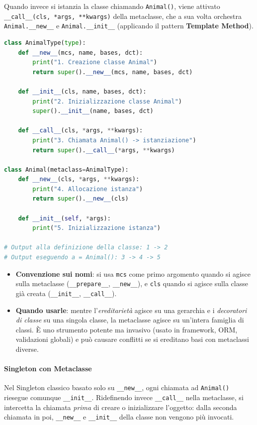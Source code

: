 \documentclass[12pt]{extarticle}
\begin{document}
Quando invece si istanzia la classe chiamando \texttt{Animal()}, viene attivato \texttt{\_\_call\_\_(cls, *args, **kwargs)} della metaclasse, che a sua volta orchestra \texttt{Animal.\_\_new\_\_} e \texttt{Animal.\_\_init\_\_} (applicando il pattern \textbf{Template Method}).

\begin{lstlisting}[language=Python]
class AnimalType(type):
    def __new__(mcs, name, bases, dct):
        print("1. Creazione classe Animal")
        return super().__new__(mcs, name, bases, dct)

    def __init__(cls, name, bases, dct):
        print("2. Inizializzazione classe Animal")
        super().__init__(name, bases, dct)

    def __call__(cls, *args, **kwargs):
        print("3. Chiamata Animal() -> istanziazione")
        return super().__call__(*args, **kwargs)

class Animal(metaclass=AnimalType):
    def __new__(cls, *args, **kwargs):
        print("4. Allocazione istanza")
        return super().__new__(cls)

    def __init__(self, *args):
        print("5. Inizializzazione istanza")

# Output alla definizione della classe: 1 -> 2
# Output eseguendo a = Animal(): 3 -> 4 -> 5
\end{lstlisting}

\begin{itemize}
    \item \textbf{Convenzione sui nomi}: si usa \texttt{mcs} come primo argomento quando si agisce sulla metaclasse (\texttt{\_\_prepare\_\_}, \texttt{\_\_new\_\_}), e \texttt{cls} quando si agisce sulla classe già creata (\texttt{\_\_init\_\_}, \texttt{\_\_call\_\_}).
    \item \textbf{Quando usarle}: mentre l'\emph{ereditarietà} agisce su una gerarchia e i \emph{decoratori di classe} su una singola classe, la metaclasse agisce su un'intera famiglia di classi. È uno strumento potente ma invasivo (usato in framework, ORM, validazioni globali) e può causare conflitti se si ereditano basi con metaclassi diverse.
\end{itemize}

\paragraph{Singleton con Metaclasse}
Nel Singleton classico basato solo su \texttt{\_\_new\_\_}, ogni chiamata ad \texttt{Animal()} riesegue comunque \texttt{\_\_init\_\_}. Ridefinendo invece \texttt{\_\_call\_\_} nella metaclasse, si intercetta la chiamata \emph{prima} di creare o inizializzare l'oggetto: dalla seconda chiamata in poi, \texttt{\_\_new\_\_} e \texttt{\_\_init\_\_} della classe non vengono più invocati.
\end{document}
